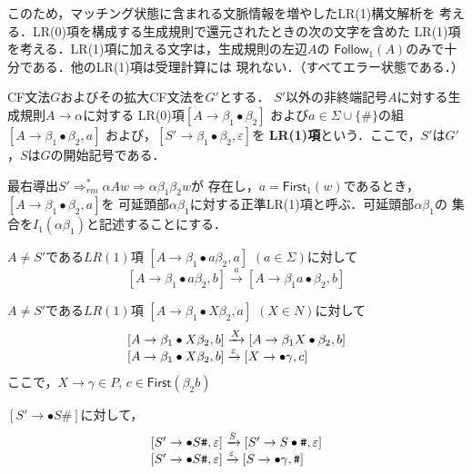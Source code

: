 \documentclass[dvipdfmx,a4j]{jbook}
\begin{document}
このため，マッチング状態に含まれる文脈情報を増やしたLR(1)構文解析を
考える．LR(0)項を構成する生成規則で還元されたときの次の文字を含めた
LR(1)項を考える．LR(1)項に加える文字は，生成規則の左辺$A$の
$\mathsf{Follow}_1(A)$のみで十分である．他のLR(1)項は受理計算には
現れない．（すべてエラー状態である．）

\begin{Def}
  CF文法$G$およびその拡大CF文法を$G'$とする．
  $S'$以外の非終端記号$A$に対する生成規則$A\rightarrow\alpha$に対する
  LR(0)項$[A\rightarrow\beta_1\bullet\beta_2]$
および$a\in\Sigma\cup\{\texttt{\#}\}$の組$[A\rightarrow\beta_1\bullet\beta_2,a]$
および，$[S'\rightarrow\beta_1\bullet\beta_2,\varepsilon]$を
{\bf LR(1)項}という．ここで，$S'$は$G'$，$S$は$G$の開始記号である．
\end{Def}

\begin{Def}
  最右導出$S'\Rightarrow^\ast_{rm}\alpha A w\Rightarrow \alpha\beta_1\beta_2 w$が
  存在し，$a=\mathsf{First}_1(w)$であるとき，$[A\rightarrow\beta_1\bullet\beta_2,a]$を
  可延頭部$\alpha\beta_1$に対する正準LR(1)項と呼ぶ．可延頭部$\alpha\beta_1$の
  集合を$I_1(\alpha\beta_1)$と記述することにする．
\end{Def}

\begin{Def}
  \begin{list}{}{}
    \item[(1)] $A\not=S'$である$LR(1)$項 $[A\rightarrow\beta_1\bullet a\beta_2,a]$ $(a\in\Sigma)$に対して
    \[[A\rightarrow\beta_1\bullet a\beta_2,b]\xrightarrow{a}[A\rightarrow\beta_1 a\bullet\beta_2,b]\]
    \item[(2)] $A\not=S'$である$LR(1)$項 $[A\rightarrow\beta_1\bullet X\beta_2,a]$ $(X\in N)$に対して
    \[\begin{array}{l}
      [A\rightarrow\beta_1\bullet X\beta_2,b]\xrightarrow{X}[A\rightarrow\beta_1 X\bullet\beta_2,b]\\\relax
      [A\rightarrow\beta_1\bullet X\beta_2,b]\xrightarrow{\varepsilon}[X\rightarrow\bullet\gamma,c]
    \end{array}\]
    ここで，$X\rightarrow\gamma\in P$, $c\in\mathsf{First}(\beta_2 b)$
    \item[(3)] $[S'\rightarrow\bullet S\texttt{\#}]$に対して，
    \[\begin{array}{l}
      [S'\rightarrow\bullet S\texttt{\#},\varepsilon]\xrightarrow{S}[S'\rightarrow S\bullet\texttt{\#},\varepsilon]\\\relax
      [S'\rightarrow\bullet S\texttt{\#},\varepsilon]\xrightarrow{\varepsilon}
      [S\rightarrow\bullet\gamma,\texttt{\#}]
    \end{array}\]
  \end{list}
\end{Def}
\end{document}
